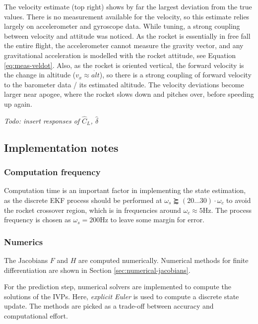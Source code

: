 The velocity estimate (top right) shows by far the largest deviation from the true values.
There is no measurement available for the velocity, so this estimate relies largely on accelerometer and gyroscope data.
While tuning, a strong coupling between velocity and attitude was noticed. 
As the rocket is essentially in free fall the entire flight, the accelerometer cannot measure the gravity vector, and any gravitational acceleration is modelled with the rocket attitude, see Equation \ref{eq:meas-veldot}.
Also, as the rocket is oriented vertical, the forward velocity is the change in altitude ($v_x \approx \dot {alt}$), so there is a strong coupling of forward velocity to the barometer data / its estimated altitude.
The velocity deviations become larger near apogee, where the rocket slows down and pitches over, before speeding up again.

\emph{Todo: insert responses of $\hat C_L$, $\hat \delta$}

\subsection{Implementation notes}
\label{sec:estimator-implementation}

\subsubsection{Computation frequency}
Computation time is an important factor in implementing the state estimation, as the discrete EKF process should be performed at $\omega_s \succapprox (20 \dots 30) \cdot \omega_c$ \cite{werner2021} to avoid the rocket crossover region, which is in frequencies around $ \omega_c \approx 5\mathrm{Hz}$.
The process frequency is chosen as $\omega_s = 200\mathrm{Hz}$ to leave some margin for error.

\subsubsection{Numerics}
The Jacobians $F$ and $H$ are computed numerically. 
Numerical methods for finite differentiation are shown in Section \ref{sec:numerical-jacobians}.

For the prediction step, numerical solvers are implemented to compute the solutions of the IVPs.
Here, \textit{explicit Euler} is used to compute a discrete state update.
The methods are picked as a trade-off between accuracy and computational effort.

